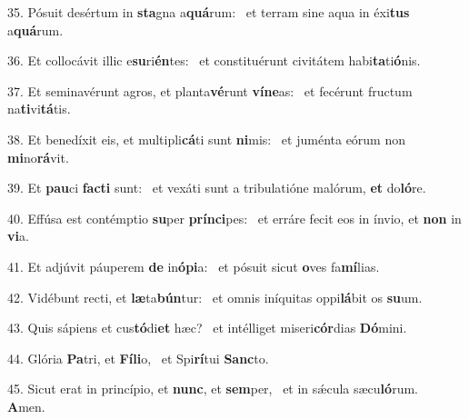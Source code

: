 35. Pósuit desértum in \textbf{sta}gna a\textbf{quá}rum: \ast\  et terram sine aqua in éxi\textbf{tus} a\textbf{quá}rum.\

36. Et collocávit illic e\textbf{su}ri\textbf{én}tes: \ast\  et constituérunt civitátem habi\textbf{ta}ti\textbf{ó}nis.\

37. Et seminavérunt agros, et planta\textbf{vé}runt \textbf{ví}\textbf{ne}as: \ast\  et fecérunt fructum na\textbf{ti}vi\textbf{tá}tis.\

38. Et benedíxit eis, et multipli\textbf{cá}ti sunt \textbf{ni}mis: \ast\  et juménta eórum non \textbf{mi}no\textbf{rá}vit.\

39. Et \textbf{pau}ci \textbf{fac}\textbf{ti} sunt: \ast\  et vexáti sunt a tribulatióne malórum, \textbf{et} do\textbf{ló}re.\

40. Effúsa est contémptio \textbf{su}per \textbf{prín}\textbf{ci}pes: \ast\  et erráre fecit eos in ínvio, et \textbf{non} in \textbf{vi}a.\

41. Et adjúvit páuperem \textbf{de} in\textbf{ó}\textbf{pi}a: \ast\  et pósuit sicut \textbf{o}ves fa\textbf{mí}lias.\

42. Vidébunt recti, et \textbf{læ}ta\textbf{bún}tur: \ast\  et omnis iníquitas oppi\textbf{lá}bit os \textbf{su}um.\

43. Quis sápiens et cus\textbf{tó}di\textbf{et} hæc? \ast\  et intélliget miseri\textbf{cór}dias \textbf{Dó}mini.\

44. Glória \textbf{Pa}tri, et \textbf{Fí}\textbf{li}o, \ast\  et Spi\textbf{rí}tui \textbf{Sanc}to.\

45. Sicut erat in princípio, et \textbf{nunc}, et \textbf{sem}per, \ast\  et in sǽcula sæcu\textbf{ló}rum. \textbf{A}men.\


